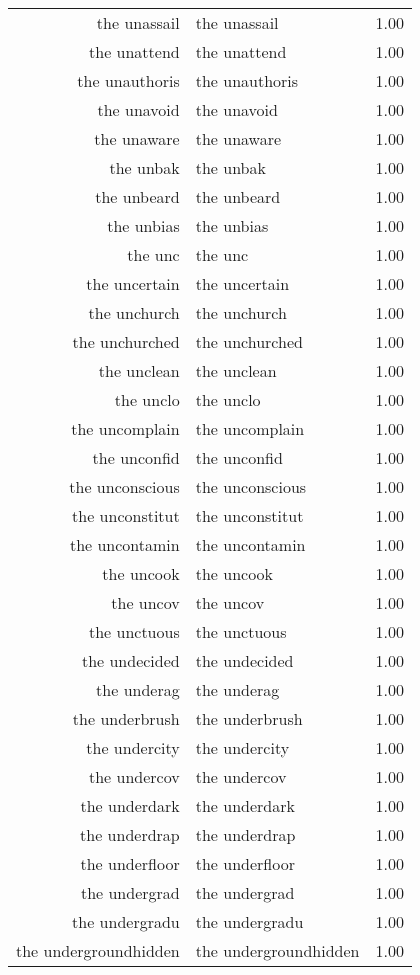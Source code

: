 \begin{table}[ht]
\begin{tabular}{rlr}
  the unassail & the unassail & 1.00 \\ 
  the unattend & the unattend & 1.00 \\ 
  the unauthoris & the unauthoris & 1.00 \\ 
  the unavoid & the unavoid & 1.00 \\ 
  the unaware & the unaware & 1.00 \\ 
  the unbak & the unbak & 1.00 \\ 
  the unbeard & the unbeard & 1.00 \\ 
  the unbias & the unbias & 1.00 \\ 
  the unc & the unc & 1.00 \\ 
  the uncertain & the uncertain & 1.00 \\ 
  the unchurch & the unchurch & 1.00 \\ 
  the unchurched & the unchurched & 1.00 \\ 
  the unclean & the unclean & 1.00 \\ 
  the unclo & the unclo & 1.00 \\ 
  the uncomplain & the uncomplain & 1.00 \\ 
  the unconfid & the unconfid & 1.00 \\ 
  the unconscious & the unconscious & 1.00 \\ 
  the unconstitut & the unconstitut & 1.00 \\ 
  the uncontamin & the uncontamin & 1.00 \\ 
  the uncook & the uncook & 1.00 \\ 
  the uncov & the uncov & 1.00 \\ 
  the unctuous & the unctuous & 1.00 \\ 
  the undecided & the undecided & 1.00 \\ 
  the underag & the underag & 1.00 \\ 
  the underbrush & the underbrush & 1.00 \\ 
  the undercity & the undercity & 1.00 \\ 
  the undercov & the undercov & 1.00 \\ 
  the underdark & the underdark & 1.00 \\ 
  the underdrap & the underdrap & 1.00 \\ 
  the underfloor & the underfloor & 1.00 \\ 
  the undergrad & the undergrad & 1.00 \\ 
  the undergradu & the undergradu & 1.00 \\ 
  the undergroundhidden & the undergroundhidden & 1.00 \\ 

\end{tabular}
\end{table}
